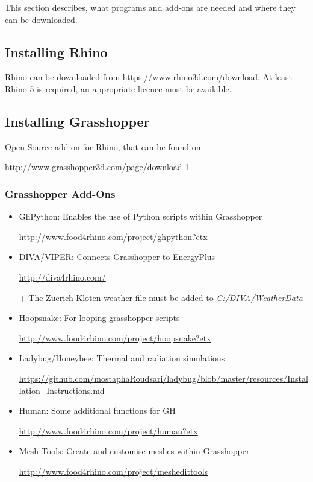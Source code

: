 	This section describes, what programs and add-ons are needed and where they can be downloaded.

	\subsection{Installing Rhino}

	Rhino can be downloaded from \url{https://www.rhino3d.com/download}. At least Rhino 5 is required, an appropriate licence must be available.
	

	\subsection{Installing Grasshopper}
	Open Source add-on for Rhino, that can be found on:

	 \url{http://www.grasshopper3d.com/page/download-1}

	\subsubsection{Grasshopper Add-Ons}
	\begin{itemize}
	\item{GhPython: Enables the use of Python scripts within Grasshopper

		\url{http://www.food4rhino.com/project/ghpython?etx}}

	\item{DIVA/VIPER: Connects Grasshopper to EnergyPlus

		\url{http://diva4rhino.com/}

	 + The Zuerich-Kloten weather file must be added to \emph{C:/DIVA/WeatherData}}

	\item{Hoopsnake: For looping grasshopper scripts

		\url{http://www.food4rhino.com/project/hoopsnake?etx}}
	\item{Ladybug/Honeybee: Thermal and radiation simulations

		\url{https://github.com/mostaphaRoudsari/ladybug/blob/master/resources/Installation_Instructions.md}}
	\item{Human: Some additional functions for GH 

		\url{http://www.food4rhino.com/project/human?etx}}
	\item{Mesh Tools: Create and customise meshes within Grasshopper

		\url{http://www.food4rhino.com/project/meshedittools}}
	\end{itemize}


